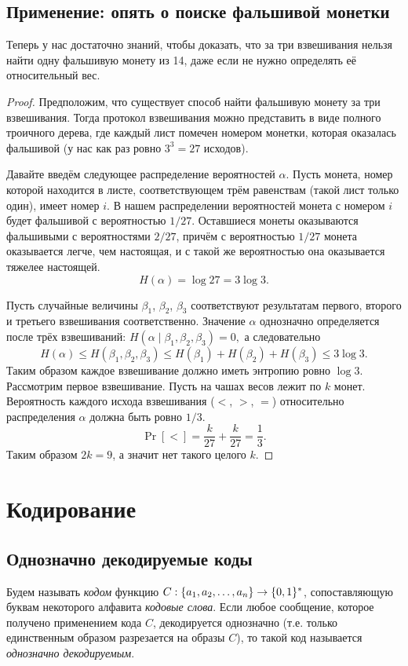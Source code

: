 \documentclass[12pt]{article}
\begin{document}
\subsection{Применение: опять о поиске фальшивой монетки}
Теперь у нас достаточно знаний, чтобы доказать, что за три взвешивания нельзя
найти одну фальшивую монету из 14, даже если не нужно определять её
относительный вес.
\begin{proof}
    Предположим, что существует способ найти фальшивую монету за три
    взвешивания. Тогда протокол взвешивания можно представить в виде полного
    троичного дерева, где каждый лист помечен номером монетки, которая оказалась
    фальшивой (у нас как раз ровно \(3^3=27\) исходов). 

    Давайте введём следующее распределение вероятностей \(\alpha\). 
    Пусть монета, номер которой находится в листе, соответствующем трём равенствам
    (такой лист только один), имеет номер \(i\). В нашем распределении
    вероятностей монета с номером \(i\) будет фальшивой с вероятностью \(1/27\).
    Оставшиеся монеты оказываются фальшивыми с вероятностями \(2/27\), причём
    с вероятностью \(1/27\) монета оказывается легче, чем настоящая, и с
    такой же вероятностью она оказывается тяжелее настоящей.
    \[
        H(\alpha) = \log 27 = 3\log 3.
    \]

    Пусть случайные величины \(\beta_1\), \(\beta_2\), \(\beta_3\) соответствуют
    результатам первого, второго и третьего взвешивания соответственно.
    Значение $\alpha$ однозначно определяется после трёх взвешиваний:
    \(
        H(\alpha\mid\beta_1,\beta_2,\beta_3) = 0,
    \)
    а следовательно
    \[
        H(\alpha) \le H(\beta_1,\beta_2,\beta_3) \le H(\beta_1) + H(\beta_2) +
        H(\beta_3) \le 3\log3.    
    \]
    Таким образом каждое взвешивание должно иметь энтропию ровно $\log3$.
    Рассмотрим первое взвешивание. Пусть на чашах весов лежит по $k$ монет.
    Вероятность каждого исхода взвешивания ($<$, $>$, $=$) относительно
    распределения $\alpha$ должна быть ровно $1/3$.
    \[
        \Pr[<] = \frac{k}{27} + \frac{k}{27} = \frac13.
    \]
    Таким образом $2k = 9$, а значит нет такого целого $k$.
\end{proof}

\section{Кодирование}
\subsection{Однозначно декодируемые коды}
\begin{definition}
    Будем называть \emph{кодом} функцию $C:\{{a}_1,{a}_2,\dotsc,{a}_{n}\}\to\{0,1\}^*$,
    сопоставляющую буквам некоторого алфавита \emph{кодовые слова}.
    Если любое сообщение, которое получено применением кода $C$, декодируется
    однозначно (т.е. только единственным образом разрезается на образы $C$), 
    то такой код называется \emph{однозначно декодируемым}.
\end{definition}
\end{document}
